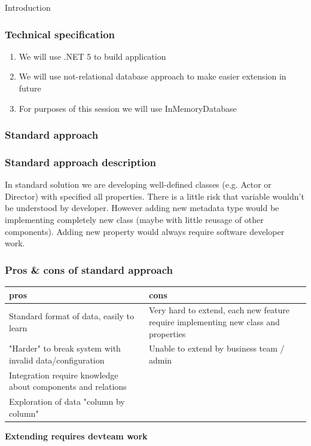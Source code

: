 \documentclass{beamer}
\begin{document}
\begin{section}{Introduction}
\begin{frame}
\frametitle{Technical specification}
\begin{enumerate}
	\item We will use .NET 5 to build application \pause
	\item We will use not-relational database approach to make easier extension in future \pause
	\item For purposes of this session we will use InMemoryDatabase
\end{enumerate}
\end{frame}

\begin{frame}
\frametitle{Standard approach}



\end{frame}


\begin{frame}
\frametitle{Standard approach description}
In standard solution we are developing well-defined classes (e.g. Actor or Director) with specified all properties. 
There is a little risk that variable wouldn't be understood by developer. However adding new metadata type would be implementing
completely new class (maybe with little reusage of other components). Adding new property would always require software developer work.

\end{frame}

\begin{frame}
\frametitle{Pros \& cons of standard approach}

\begin{center}

\begin{tabular}{ | m{5.2cm} |  m{5.2cm} | }

\hline
 pros & cons \\ 
\hline \hline
Standard format of data, easily to learn & Very hard to extend, each new feature require implementing new class and properties \\  
\hline
 "Harder" to break system with invalid data/configuration & Unable to extend by business team / admin \\
\hline
Integration require knowledge about components and relations & \\ 
\hline
Exploration of data "column by column" & \\
\hline

\end{tabular}

 \pause \textbf{Extending requires devteam work}

\end{center}

\end{frame}

\end{section}
\end{document}
